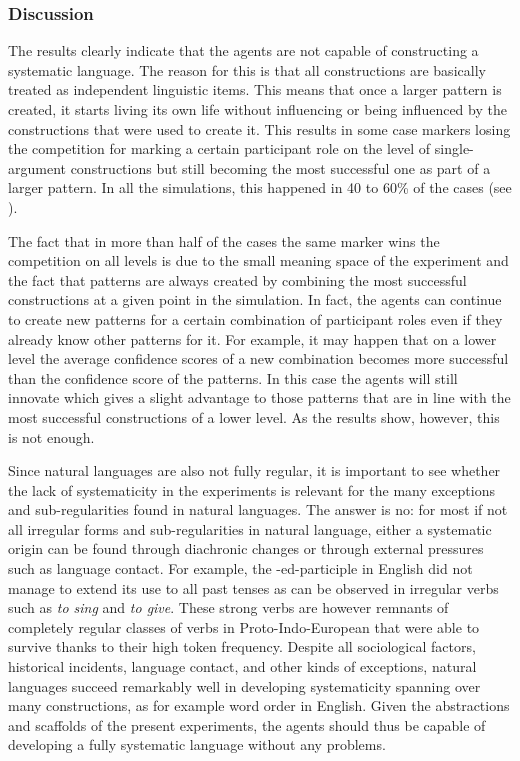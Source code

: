 \subsubsection{Discussion}
 The results clearly indicate that the agents are not capable of constructing a systematic language. The reason for this is that all constructions are basically treated as independent linguistic items. This means that once a larger pattern is created, it starts living its own life without influencing or being influenced by the constructions that were used to create it. This results in some case markers losing the competition for marking a certain participant role on the level of single-argument constructions but still becoming the most successful one as part of a larger pattern. In all the simulations, this happened in 40 to 60\% of the cases (see ).

The fact that in more than half of the cases the same marker wins the competition on all levels is due to the small meaning space of the experiment and the fact that patterns are always created by combining the most successful constructions at a given point in the simulation. In fact, the agents can continue to create new patterns for a certain combination of participant roles even if they already know other patterns for it. For example, it may happen that on a lower level the average confidence scores of a new combination becomes more successful than the confidence score of the patterns. In this case the agents will still innovate which gives a slight advantage to those patterns that are in line with the most successful constructions of a lower level. As the results show, however, this is not enough.

Since natural languages are also not fully regular, it is important to see whether the lack of systematicity in the experiments is relevant for the many exceptions and sub-regularities found in natural languages. The answer is no: for most if not all irregular forms and sub-regularities in natural language, either a systematic origin can be found through diachronic changes or through external pressures such as language contact. For example, the -ed-participle in English did not manage to extend its use to all past tenses as can be observed in irregular verbs such as {\em to sing} and {\em to give}. These strong verbs are however remnants of completely regular classes of verbs in Proto-Indo-European that were able to survive thanks to their high token frequency. Despite all sociological factors, historical incidents, language contact, and other kinds of exceptions, natural languages succeed remarkably well in developing systematicity spanning over many constructions, as for example word order in English. Given the abstractions and scaffolds of the present experiments, the agents should thus be capable of developing a fully systematic language without any problems.

